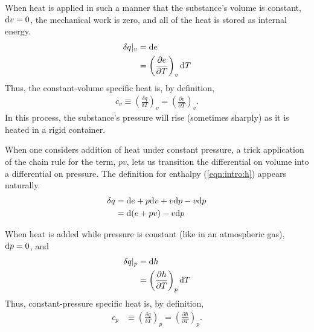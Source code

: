 When heat is applied in such a manner that the substance's volume is constant, $\mathrm{d} v = 0$, the mechanical work is zero, and all of the heat is stored as internal energy.
\begin{align}
\delta q |_v &= \mathrm{d} e\nonumber\\
 &= \left(\frac{\partial e}{\partial T}\right)_v \mathrm{d} T
\end{align}
Thus, the constant-volume specific heat is, by definition, 
\begin{align}
c_v \equiv \left(\frac{\delta q}{\delta T}\right)_v = \left(\frac{\partial e}{\partial T}\right)_v.\label{eqn:intro:cv}
\end{align}
In this process, the substance's pressure will rise (sometimes sharply) as it is heated in a rigid container.

When one considers addition of heat under constant pressure, a trick application of the chain rule for the term, $pv$, lets us transition the differential on volume into a differential on pressure.  The definition for enthalpy (\ref{eqn:intro:h}) appears naturally.
\begin{align}
\delta q &= \mathrm{d} e + p \mathrm{d} v + v\mathrm{d} p - v \mathrm{d} p\nonumber\\
 &= \mathrm{d}(e + pv) - v\mathrm{d} p
\end{align}

When heat is added while pressure is constant (like in an atmospheric gas), $\mathrm{d} p=0$, and 
\begin{align}
\delta q |_p &= \mathrm{d} h\nonumber\\
 &= \left( \frac{\partial h}{\partial T}\right)_p \mathrm{d} T
\end{align}
Thus, constant-pressure specific heat is, by definition,
\begin{align}
c_p &\equiv \left(\frac{\delta q}{\delta T}\right)_p = \left( \frac{\partial h}{\partial T}\right)_p.\label{eqn:intro:cp}
\end{align}



%
% 
%
